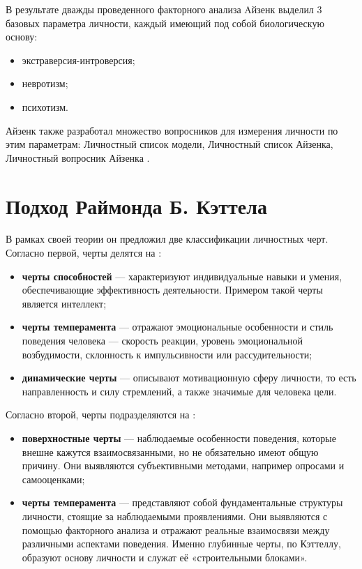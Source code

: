 В результате дважды проведенного факторного анализа Aйзенк выделил 3 базовых параметра личности, каждый  имеющий под собой биологическую основу: 

\begin{itemize}
	\item экстраверсия-интроверсия;
	
	\item невротизм;
	
	\item психотизм.
\end{itemize}

 Айзенк также разработал множество вопросников для измерения личности по этим параметрам: Личностный список модели, Личностный список Айзенка, Личностный вопросник Айзенка \cite{PervinJohn2001Personality}.

\section{Подход Раймонда Б. Кэттела}

В рамках своей теории он предложил две классификации личностных черт. Согласно первой, черты делятся на \cite{PervinJohn2001Personality}:
 
\begin{itemize}
	\item \textbf{черты способностей} --- характеризуют индивидуальные навыки и умения, обеспечивающие эффективность деятельности. Примером такой черты является интеллект;
	
	\item \textbf{черты темперамента} --- отражают эмоциональные особенности и стиль поведения человека — скорость реакции, уровень эмоциональной возбудимости, склонность к импульсивности или рассудительности;
	
	\item \textbf{динамические черты} --- описывают мотивационную сферу личности, то есть направленность и силу стремлений, а также значимые для человека цели.
\end{itemize}

Согласно второй, черты подразделяются на \cite{PervinJohn2001Personality}: 

\begin{itemize}
	\item \textbf{поверхностные черты} --- наблюдаемые особенности поведения, которые внешне кажутся взаимосвязанными, но не обязательно имеют общую причину. Они выявляются субъективными методами, например опросами и самооценками;
	
	\item \textbf{черты темперамента} --- представляют собой фундаментальные структуры личности, стоящие за наблюдаемыми проявлениями. Они выявляются с помощью факторного анализа и отражают реальные взаимосвязи между различными аспектами поведения. Именно глубинные черты, по Кэттеллу, образуют основу личности и служат её «строительными блоками».
\end{itemize}

